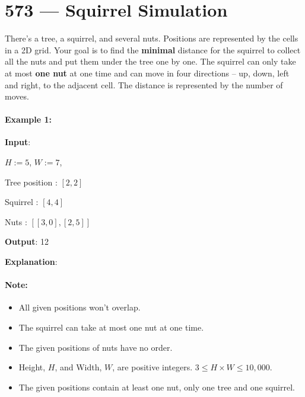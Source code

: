 \section{573 --- Squirrel Simulation}
There's a tree, a squirrel, and several nuts. Positions are represented by the cells in a 2D grid. Your goal is to find the \textbf{minimal} distance for the squirrel to collect all the nuts and put them under the tree one by one. The squirrel can only take at most \textbf{one nut} at one time and can move in four directions -- up, down, left and right, to the adjacent cell. The distance is represented by the number of moves.

\paragraph{Example 1:}

\begin{flushleft}
\textbf{Input}: 

$H:=5$, $W:=7$, 

Tree position : $[2,2]$

Squirrel : $[4,4]$

Nuts : $[[3,0], [2,5]]$

\textbf{Output}: 12

\textbf{Explanation}:
\begin{figure}[H]
\end{figure}

\end{flushleft}

\paragraph{Note:}

\begin{itemize}
\item All given positions won't overlap.
\item The squirrel can take at most one nut at one time.
\item The given positions of nuts have no order.
\item Height, $H$, and Width, $W$, are positive integers. $3 \leq H\times W \leq 10,000$.
\item The given positions contain at least one nut, only one tree and one squirrel.
\end{itemize}

